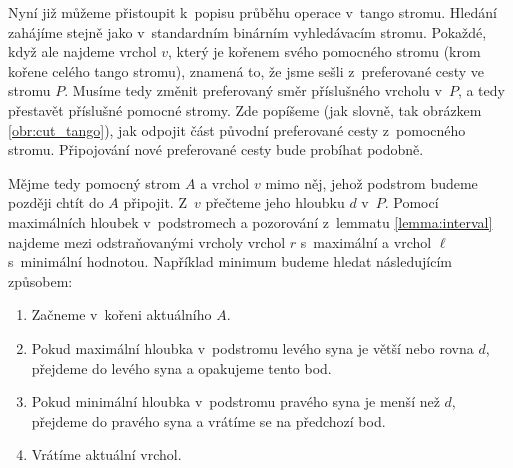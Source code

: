 Nyní již můžeme přistoupit k~popisu průběhu operace  v~tango stromu.
Hledání zahájíme stejně jako v~standardním binárním vyhledávacím stromu. Pokaždé,
když ale najdeme vrchol $v$, který je kořenem svého pomocného stromu (krom
kořene celého tango stromu), znamená to, že jsme sešli z~preferované cesty ve
stromu $P$. Musíme tedy změnit preferovaný směr příslušného vrcholu v~$P$, a
tedy přestavět příslušné pomocné stromy. Zde popíšeme (jak slovně, tak obrázkem \ref{obr:cut_tango}), jak odpojit část původní
preferované cesty z~pomocného stromu. Připojování nové preferované cesty bude
probíhat podobně.

Mějme tedy pomocný strom $A$ a vrchol $v$ mimo něj, jehož podstrom budeme později chtít do $A$ připojit. Z~$v$ přečteme jeho hloubku $d$ v~$P$. Pomocí maximálních hloubek v~podstromech a pozorování z~lemmatu \ref{lemma:interval} najdeme mezi odstraňovanými vrcholy vrchol $r$ s~maximální a vrchol $\ell$ s~minimální hodnotou. Například minimum budeme hledat následujícím způsobem:

\begin{enumerate}
\item Začneme v~kořeni aktuálního $A$.
\item Pokud maximální hloubka v~podstromu levého syna je větší nebo rovna $d$, přejdeme do levého syna a opakujeme tento bod.
\item Pokud minimální hloubka v~podstromu pravého syna je menší než $d$, přejdeme do pravého syna a vrátíme se na předchozí bod.
\item Vrátíme aktuální vrchol.
\end{enumerate}

